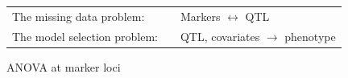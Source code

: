\documentclass[12pt]{article}
\newcommand{\headsize}{\fontsize{35}{35} \selectfont}
\newcommand{\smallsize}{\fontsize{25}{30} \selectfont}
\begin{document}
\vspace{15mm}

\hspace*{3cm}\begin{tabular}{lll}
{\color{mypink} The missing data problem:}  & \hspace{15mm} &
Markers $\longleftrightarrow$ QTL \\[15mm]

{\color{mypink} The model selection problem:}
& & QTL, covariates $\longrightarrow$ phenotype
\end{tabular}





\newpage

\headsize \color{myyellow}
\hfill\begin{minipage}{5.75in}
\centering
ANOVA at marker loci
\end{minipage}

\vspace{2cm}

\color{mywhite} \smallsize
\end{document}
